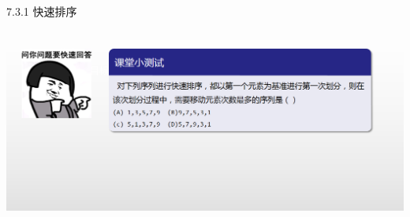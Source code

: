 %

\begin{frame}[fragile]{7.3.1 快速排序}
~\\
~\\
\begin{center}
\includegraphics[scale=0.3]{quick_sort_5.png}
\end{center}
\end{frame}

